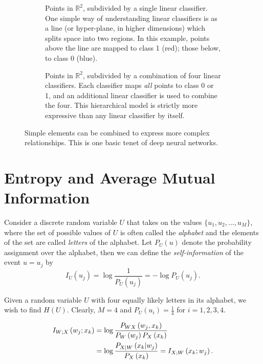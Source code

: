 \begin{figure}[b]
\centering
\begin{subfigure}[t]{0.45\textwidth}
	\smfigboxes
\caption{Points in $\mathbb{R}^2$, subdivided by a single linear classifier. One simple way of understanding linear classifiers is as a line (or hyper-plane, in higher dimensions) which splits space into two regions. In this example, points above the line are mapped to class 1 (red); those below, to class 0 (blue).}
\label{subfig:linclass}
\end{subfigure}%
\qquad%
\begin{subfigure}[t]{0.45\textwidth}
	\smfigboxes
\caption{Points in $\mathbb{R}^2$, subdivided by a combination of four linear classifiers. Each classifier maps \emph{all} points to class 0 or 1, and an additional linear classifier is used to combine the four. This hierarchical model is strictly more expressive than any linear classifier by itself.}
\label{subfig:circclass}
\end{subfigure}%
\caption{Simple elements can be combined to express more complex relationships.
This is one basic tenet of deep neural networks.}
\label{fig:classifiers}
\end{figure}


\section{Entropy and Average Mutual Information}
\label{ch01.sec2}

Consider a discrete random variable $U$ that takes on
the values $\{u_1, u_2, \dots, u_M\}$, where the set of possible
values of $U$ is often called the \textit{alphabet} and the elements
of the set are called \textit{letters} of the alphabet. Let $P_U(u)$
denote the probability  assignment  over the alphabet, then we can
define the \textit{self-information} of the event $ u = u_j $ by
\begin{equation}
  I_U \left( u_j \right) = \log \frac{1}{P_U (u_j)} = - \log P_U
    \left( u_j \right).
\label{ch01.eq1}
\end{equation}

\begin{example}
\label{ch01.ex1}
Given a random variable $U$ with four equally likely letters
in its alphabet, we wish to find $H(U)$. Clearly, $M=4$
and $P_U(u_i)= \tfrac{1}{4}$ for $ i = 1, 2, 3, 4 $.

\begin{align}
    I_{W;X}\left(w_j;x_k\right)
    & = \log
    \frac{P_{WX}\left(w_j, x_k\right)}{P_W\left(w_j\right)
              P_X\left(x_k\right)}
    \notag\\
    & = \log
    \frac{P_{X|W} \left( x_k | w_j\right)} {P_X \left(x_k\right)}
    =
     I_{X;W} \left(x_k; w_j\right).
\label{ch01.eq2}
\end{align}
\end{example}

